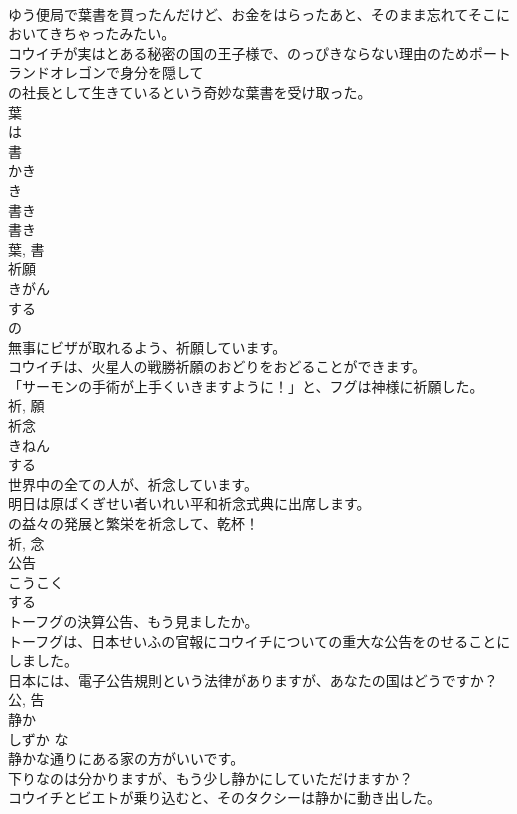 \documentclass[8pt]{extreport}
\begin{document}
\begin{CJK}{UTF8}{min}
\\	ゆう便局で葉書を買ったんだけど、お金をはらったあと、そのまま忘れてそこにおいてきちゃったみたい。	
\\	コウイチが実はとある秘密の国の王子様で、のっぴきならない理由のためポートランドオレゴンで身分を隠して
\\	の社長として生きているという奇妙な葉書を受け取った。	
\\	葉 
\\	は 
\\	書 
\\	かき 
\\	き 
\\	書き 
\\	書き 
\\	葉, 書	
\\	祈願	
\\	きがん	
\\	する 
\\	の 
\\	無事にビザが取れるよう、祈願しています。	
\\	コウイチは、火星人の戦勝祈願のおどりをおどることができます。	
\\	「サーモンの手術が上手くいきますように！」と、フグは神様に祈願した。	
\\	祈, 願	
\\	祈念	
\\	きねん	
\\	する 
\\	世界中の全ての人が、祈念しています。	
\\	明日は原ばくぎせい者いれい平和祈念式典に出席します。	
\\	の益々の発展と繁栄を祈念して、乾杯！	
\\	祈, 念	
\\	公告	
\\	こうこく	
\\	する 
\\	トーフグの決算公告、もう見ましたか。	
\\	トーフグは、日本せいふの官報にコウイチについての重大な公告をのせることにしました。	
\\	日本には、電子公告規則という法律がありますが、あなたの国はどうですか？	
\\	公, 告	
\\	静か	
\\	しずか	な 
\\	静かな通りにある家の方がいいです。	
\\	下りなのは分かりますが、もう少し静かにしていただけますか？	
\\	コウイチとビエトが乗り込むと、そのタクシーは静かに動き出した。	

\end{CJK}
\end{document}
